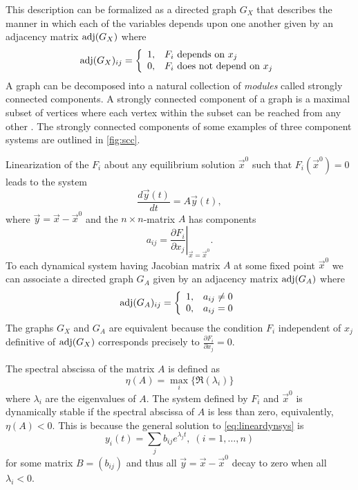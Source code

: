 This description can be formalized as a directed graph $G_X$ that describes the manner in which each of the variables depends upon one another given by an adjacency matrix $\mathrm{adj}(G_X)$ where
 \begin{displaymath}
   \mathrm{adj}(G_X)_{ij} = \left\{
     \begin{array}{ll}
       1, & F_i \hbox{ depends on } x_j\\
       0, & F_i \hbox{ does not depend on } x_j
     \end{array}
   \right.
\end{displaymath}
A graph can be decomposed into a natural collection of \emph{modules} called strongly connected components. A strongly connected component of a graph is a maximal subset of vertices where each vertex within the subset can be reached from any other \cite{Cormen2009}. The strongly connected components of some examples of three component systems are outlined in \ref{fig:scc}.

Linearization of the $F_i$ about any equilibrium solution $\vec{x}^0$ such that $F_i(\vec{x}^0)=0$ leads to the system
\begin{equation}\label{eq:lineardynsys}
\frac{d\vec{y}(t)}{dt} = A \vec{y}(t),
\end{equation}
where $\vec{y} = \vec{x} - \vec{x}^0$ and the $n \times n$-matrix $A$ has components
$$
a_{ij} = \left. \frac{\partial F_i}{\partial x_j} \right|_{\vec{x} = \vec{x}^0}.
$$
To each dynamical system having Jacobian matrix $A$ at some fixed point $\vec{x}^0$ we can associate a directed graph $G_A$ given by an adjacency matrix $\mathrm{adj}(G_A)$ where
 \begin{displaymath}
   \mathrm{adj}(G_A)_{ij} = \left\{
     \begin{array}{lr}
       1, & a_{ij} \neq 0\\
       0, & a_{ij} = 0
     \end{array}
   \right.
\end{displaymath}
The graphs $G_X$ and $G_A$ are equivalent because the condition $F_i$ independent of $x_j$ definitive of $\mathrm{adj}(G_X)$ corresponds precisely to $\frac{\partial F_i}{\partial x_j}=0$.

The spectral abscissa of the matrix $A$ is defined as
$$
\eta(A) = \max_i \{\Re(\lambda_i)\}
$$
where $\lambda_i$ are the eigenvalues of $A$. The system defined by $F_i$ and $\vec{x}^0$ is dynamically stable if the spectral abscissa of $A$ is less than zero, equivalently, $\eta(A) < 0$. This is because the general solution to \ref{eq:lineardynsys} is
$$
y_i(t) = \sum_j b_{ij} e^{\lambda_j t}, \; (i=1,\ldots,n)
$$
for some matrix $B=(b_{ij})$ and thus all $\vec{y} = \vec{x} - \vec{x}^0$ decay to zero when all $\lambda_i < 0$.

